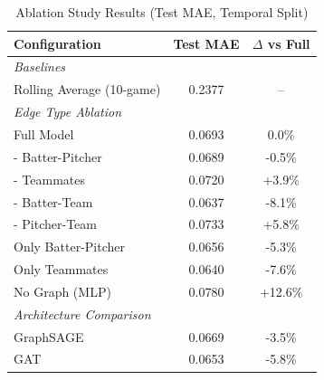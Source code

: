 
\begin{table}[h]
\centering
\caption{Ablation Study Results (Test MAE, Temporal Split)}
\label{tab:ablation}
\begin{tabular}{lcc}
\toprule
\textbf{Configuration} & \textbf{Test MAE} & \textbf{$\Delta$ vs Full} \\
\midrule
\multicolumn{3}{l}{\textit{Baselines}} \\
Rolling Average (10-game) & 0.2377 & -- \\
\midrule
\multicolumn{3}{l}{\textit{Edge Type Ablation}} \\
Full Model & 0.0693 & 0.0\% \\
- Batter-Pitcher & 0.0689 & -0.5\% \\
- Teammates & 0.0720 & +3.9\% \\
- Batter-Team & 0.0637 & -8.1\% \\
- Pitcher-Team & 0.0733 & +5.8\% \\
Only Batter-Pitcher & 0.0656 & -5.3\% \\
Only Teammates & 0.0640 & -7.6\% \\
No Graph (MLP) & 0.0780 & +12.6\% \\

\midrule
\multicolumn{3}{l}{\textit{Architecture Comparison}} \\
GraphSAGE & 0.0669 & -3.5\% \\
GAT & 0.0653 & -5.8\% \\

\bottomrule
\end{tabular}
\end{table}
